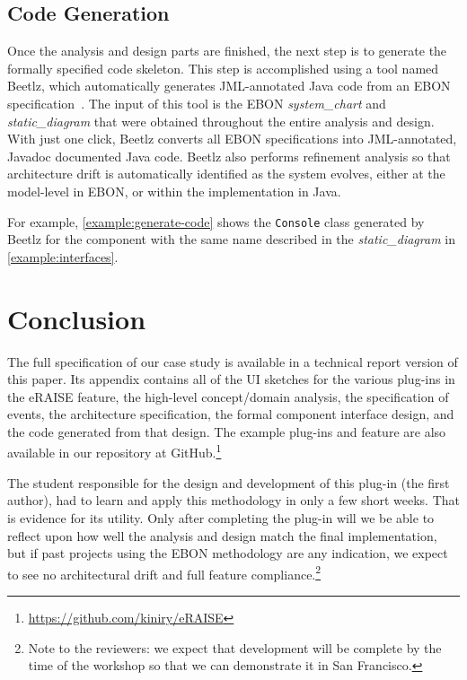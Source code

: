\documentclass[conference]{IEEEtran}
\begin{document}
%
\subsection{Code Generation}
\label{sec:code-generation}

Once the analysis and design parts are finished, the next step is to
generate the formally specified code skeleton.  This step is
accomplished using a tool named Beetlz, which automatically generates
JML-annotated Java code from an EBON specification~\cite{Darulova09}.
The input of this tool is the EBON \emph{system\_chart} and
\emph{static\_diagram} that were obtained throughout the entire
analysis and design.  With just one click, Beetlz converts all EBON
specifications into JML-annotated, Javadoc documented Java code.
Beetlz also performs refinement analysis so that architecture drift is
automatically identified as the system evolves, either at the
model-level in EBON, or within the implementation in Java.

For example, \autoref{example:generate-code} shows the
\texttt{Console} class generated by Beetlz for the component with the
same name described in the \emph{static\_diagram} in
\autoref{example:interfaces}.




\section{Conclusion}
\label{sec:conclusion}

The full specification of our case study is available in a technical
report version of this paper.  Its appendix contains all of the UI
sketches for the various plug-ins in the eRAISE feature, the high-level
concept/domain analysis, the specification of events, the architecture
specification, the formal component interface design, and the code
generated from that design.  The example plug-ins and feature are also
available in our repository at
GitHub.\footnote{\url{https://github.com/kiniry/eRAISE}}

The student responsible for the design and development of this plug-in
(the first author), had to learn and apply this methodology in only a
few short weeks.  That is evidence for its utility.  Only after
completing the plug-in will we be able to reflect upon how well the
analysis and design match the final implementation, but if past
projects using the EBON methodology are any indication, we expect to
see no architectural drift and full feature compliance.\footnote{Note
  to the reviewers: we expect that development will be complete by the
  time of the workshop so that we can demonstrate it in San Francisco.}
\end{document}
